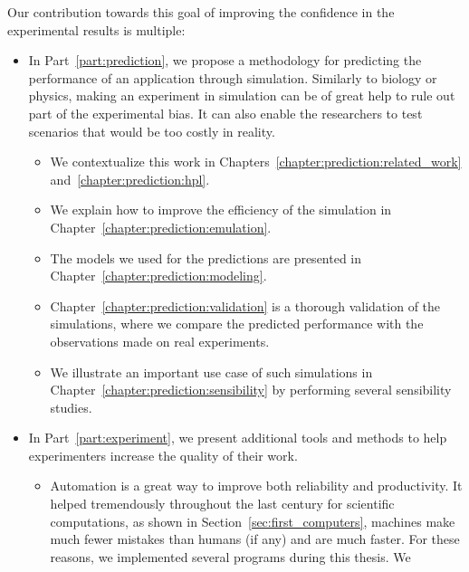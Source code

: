         Our contribution towards this goal of improving the confidence in the experimental results is multiple:
        \begin{itemize}
            \item In Part~\ref{part:prediction}, we propose a methodology for predicting the performance of an
                application through simulation. Similarly to biology or physics, making an experiment in simulation
                can be of great help to rule out part of the experimental bias. It can also enable the researchers to
                test scenarios that would be too costly in reality.
                \begin{itemize}
                    \item We contextualize this work in Chapters~\ref{chapter:prediction:related_work}
                        and~\ref{chapter:prediction:hpl}.
                    \item We explain how to improve the efficiency of the simulation in
                        Chapter~\ref{chapter:prediction:emulation}.
                    \item The models we used for the predictions are presented in
                        Chapter~\ref{chapter:prediction:modeling}.
                    \item Chapter~\ref{chapter:prediction:validation} is a thorough validation of the simulations, where
                        we compare the predicted performance with the observations made on real experiments.
                    \item We illustrate an important use case of such simulations in
                        Chapter~\ref{chapter:prediction:sensibility} by performing several sensibility studies.
                \end{itemize}
            \item In Part~\ref{part:experiment}, we present additional tools and methods to help experimenters increase
                the quality of their work.
                \begin{itemize}
                    \item Automation is a great way to improve both reliability and productivity. It helped tremendously
                        throughout the last century for scientific computations, as shown in
                        Section~\ref{sec:first_computers}, machines make much fewer mistakes than humans (if any) and
                        are much faster. For these reasons, we implemented several programs during this thesis. We

\end{itemize}
\end{itemize}
